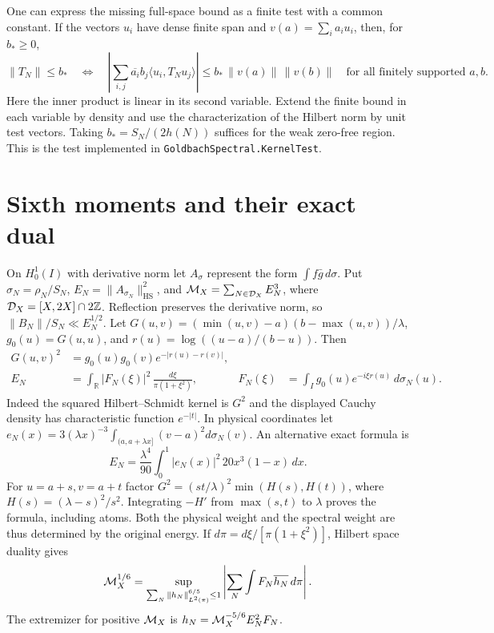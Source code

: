 \documentclass[11pt,a4paper]{article}
\newcommand{\R}{{\mathbb R}}\newcommand{\C}{{\mathbb C}}\newcommand{\Z}{{\mathbb Z}}
\newcommand{\HS}{{\mathrm{HS}}}\newcommand{\sep}{{\mathrm{sep}}}
\begin{document}
One can express the missing full-space bound as a finite test with a common constant. If the vectors \(u_i\) have dense finite span and \(v(a)=\sum_i a_i u_i\), then, for \(b_*\ge0\),
\[
 \|T_N\|\le b_* \quad\Longleftrightarrow\quad
 \left|\sum_{i,j}\overline{a_i}b_j\langle u_i,T_Nu_j\rangle\right|
      \le b_*\,\|v(a)\|\,\|v(b)\|
 \quad\text{for all finitely supported }a,b.
\]
Here the inner product is linear in its second variable. Extend the finite bound in each variable by density and use the characterization of the Hilbert norm by unit test vectors. Taking \(b_*=S_N/(2h(N))\) suffices for the weak zero-free region. This is the test implemented in \texttt{GoldbachSpectral.KernelTest}.

\section{Sixth moments and their exact dual}
On \(H^1_0(I)\) with derivative norm let \(A_\sigma\) represent the form \(\int f\bar g\,d\sigma\). Put \(\sigma_N=\rho_N/S_N\), \(E_N=\|A_{\sigma_N}\|_{\HS}^2\), and \({\cal M}_X=\sum_{N\in{\cal D}_X}E_N^3\), where \({\cal D}_X=[X,2X]\cap2\Z\). Reflection preserves the derivative norm, so \(\|B_N\|/S_N\ll E_N^{1/2}\).
Let \(G(u,v)=(\min(u,v)-a)(b-\max(u,v))/\lambda\), \(g_0(u)=G(u,u)\), and \(r(u)=\log((u-a)/(b-u))\). Then
\begin{align}
 G(u,v)^2&=g_0(u)g_0(v)e^{-|r(u)-r(v)|},\nonumber\\
 E_N&=\int_\R |F_N(\xi)|^2\,\frac{d\xi}{\pi(1+\xi^2)},&
 F_N(\xi)&=\int_I g_0(u)e^{-i\xi r(u)}\,d\sigma_N(u).
 \label{eq:green}
\end{align}
Indeed the squared Hilbert--Schmidt kernel is \(G^2\) and the displayed Cauchy density has characteristic function \(e^{-|t|}\). In physical coordinates let \(e_N(x)=3(\lambda x)^{-3}\int_{(a,a+\lambda x]}(v-a)^2d\sigma_N(v)\). An alternative exact formula is
\[
 E_N=\frac{\lambda^4}{90}\int_0^1|e_N(x)|^2\,20x^3(1-x)\,dx .
\]
For \(u=a+s,v=a+t\) factor \(G^2=(st/\lambda)^2\min(H(s),H(t))\), where \(H(s)=(\lambda-s)^2/s^2\). Integrating \(-H'\) from \(\max(s,t)\) to \(\lambda\) proves the formula, including atoms. Both the physical weight and the spectral weight are thus determined by the original energy. If \(d\pi=d\xi/[\pi(1+\xi^2)]\), Hilbert space duality gives
\[
 {\cal M}_X^{1/6}=\sup_{\sum_N\|h_N\|_{L^2(\pi)}^{6/5}\le1}
 \left|\sum_N\int F_N\overline{h_N}\,d\pi\right|.
\]
The extremizer for positive \({\cal M}_X\) is \(h_N={\cal M}_X^{-5/6}E_N^2F_N\).
\end{document}
